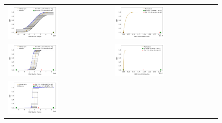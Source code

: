 \begin{figure}[tb]
	\centering
	\begin{tabular}{l l}
		\includegraphics[width=0.5\textwidth]{pics/traincars3_range_CDF.png}
		&
		\includegraphics[width=0.5\textwidth]{pics/traincars3_abs_error_CDF.png}
		\\
		\includegraphics[width=0.5\textwidth]{pics/traincars3_gaussian_range_CDF.png}
		&
		\includegraphics[width=0.5\textwidth]{pics/traincars3_gaussian_abs_error_CDF.png}
		\\
		\includegraphics[width=0.5\textwidth]{pics/traincars3_exp_range_CDF.png}

\end{tabular}
\end{figure}
